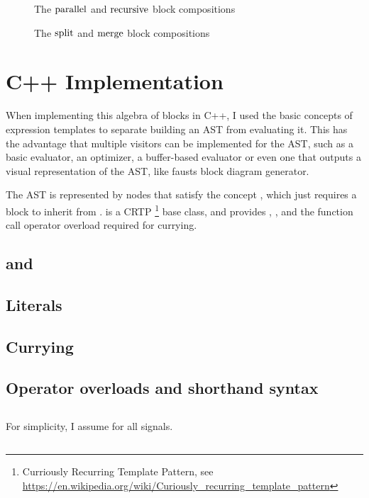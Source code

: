 \begin{figure}
  \centering
\end{figure}

\begin{figure}
  \centering
  \label{fig:block_par}
  \label{fig:block_rec}
  
  
  \caption{The $\textrm{parallel}$ and $\textrm{recursive}$ block compositions}
\end{figure}

\begin{figure}
  \label{fig:block_split}
  \label{fig:block_merge}
  \centering
  
  
  \caption{The $\textrm{split}$ and $\textrm{merge}$ block compositions}
\end{figure}

\section{C++ Implementation}

When implementing this algebra of blocks in C++, I used the basic concepts of expression templates to separate building
an AST from evaluating it. This has the advantage that multiple visitors can be implemented for the AST, such as a
basic evaluator, an optimizer, a buffer-based evaluator or even one that outputs a visual representation of the AST,
like fausts block diagram generator.

The AST is represented by nodes that satisfy the concept , which just requires a block
 to inherit from .  is a CRTP
\footnote{Curriously Recurring Template Pattern, see
  \url{https://en.wikipedia.org/wiki/Curiously_recurring_template_pattern}}
base class, and provides , , and the function call operator overload
required for currying.

\subsection{ and }
\subsection{Literals}
\subsection{Currying}
\subsection{Operator overloads and shorthand syntax}

\subsection{}
For simplicity, I assume  for all signals.
\subsection{}

